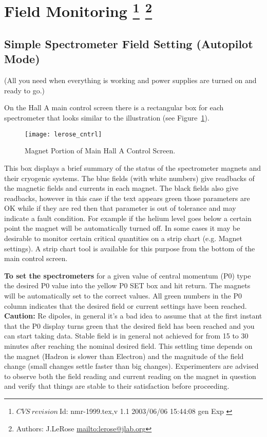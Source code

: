 \section[Field Monitoring]{Field Monitoring
\footnote{
  $CVS~revision~ $Id: nmr-1999.tex,v 1.1 2003/06/06 15:44:08 gen Exp $ $ 
}
\footnote{Authors: J.LeRose \url{mailto:lerose@jlab.org}}
}
\subsection{Simple Spectrometer Field Setting (Autopilot Mode)}
\noindent (All you need when everything is working and power
 supplies are turned on and ready to go.)

 \noindent 
 On the Hall A main control screen there is a rectangular box for each spectrometer that looks similar to the illustration
(see Figure~\ref{fig:cntrl}). 

\begin{figure}
\begin{center}
\texttt{[image: lerose\_cntrl]}
{\linespread{1.}
\caption[Spectrometers: Magnet Controls Screen]{Magnet Portion of Main Hall A Control Screen.}
\label{fig:cntrl}}
\end{center}
\end{figure}

This box displays a brief summary of the status of the spectrometer magnets and their cryogenic systems. The blue fields 
(with white numbers) give readbacks of the magnetic fields and currents in each magnet. The black fields also give readbacks, 
however in this case if the text appears green those parameters are OK while if they are red then that parameter is out of 
tolerance and may indicate a fault condition. For example if the helium level goes below a certain point the magnet will be 
automatically turned off.  In some cases it may be desirable to monitor certain critical quantities on a strip chart 
(e.g. Magnet settings). A strip chart tool is available for this purpose from the bottom of the main control screen.

{\bf To set the spectrometers} for a given value of central momentum (P0) type the desired P0 value into the yellow P0 SET box and hit return. The magnets will be automatically set to the correct values. All green numbers in the P0 column indicates that the desired field or current settings have been reached. 
{\bf Caution:} Re dipoles, in general it's a bad idea to assume that at the first instant that the P0 display turns green that the desired field has been reached and you can start taking data. Stable field is in general not achieved for from 15 to 30 minutes after reaching the nominal desired field. This settling time depends on the magnet (Hadron is slower than Electron) and the magnitude of the field change (small changes settle faster than big changes). Experimenters are advised to observe both the field reading and current reading on the magnet in question and verify that things are stable to their satisfaction before proceeding.
 
